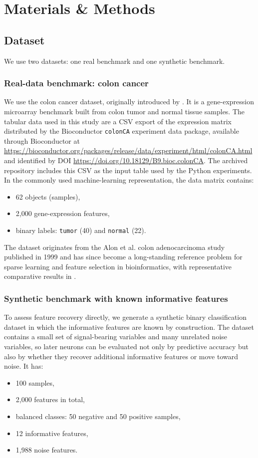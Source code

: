\section*{Materials \& Methods}

\subsection*{Dataset}
We use two datasets: one real benchmark and one synthetic benchmark.

\subsubsection*{Real-data benchmark: colon cancer}
We use the colon cancer dataset, originally introduced by \cite{alon1999}. It is a gene-expression
microarray benchmark built from colon tumor and normal tissue samples.
The tabular data used in this study are a CSV export of the expression matrix distributed by the Bioconductor
\texttt{colonCA} experiment data package, available through Bioconductor at
\url{https://bioconductor.org/packages/release/data/experiment/html/colonCA.html} and identified by DOI
\url{https://doi.org/10.18129/B9.bioc.colonCA}. The archived repository includes this CSV as the input table
used by the Python experiments.
In the commonly used machine-learning representation, the data matrix contains:
\begin{itemize}[noitemsep]
\item 62 objects (samples),
\item 2,000 gene-expression features,
\item binary labels: \texttt{tumor} (40) and \texttt{normal} (22).
\end{itemize}

The dataset originates from the Alon et al. colon adenocarcinoma study published in 1999 \cite{alon1999}
and has since become a long-standing reference problem for sparse learning and feature selection in
bioinformatics, with representative comparative results in \cite{guyon2002,dudoit2002,li2004}.

\subsubsection*{Synthetic benchmark with known informative features}
To assess feature recovery directly, we generate a synthetic binary classification dataset in which the
informative features are known by construction. The dataset contains a small set of signal-bearing variables
and many unrelated noise variables, so later neurons can be evaluated not only by predictive accuracy but also
by whether they recover additional informative features or move toward noise. It has:
\begin{itemize}[noitemsep]
\item 100 samples,
\item 2,000 features in total,
\item balanced classes: 50 negative and 50 positive samples,
\item 12 informative features,
\item 1,988 noise features.
\end{itemize}

